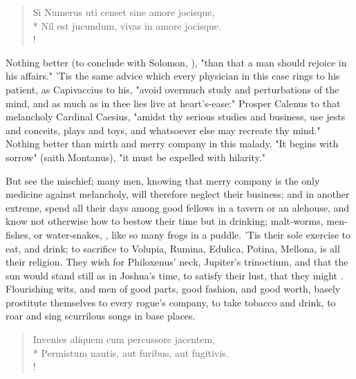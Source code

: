 {\begin{latin}
\begin{verse}%
Si Numerus uti censet sine amore jocisque,\\*
Nil est jucundum, vivas in amore jocisque.\\!
\end{verse}%
\end{latin}
%

Nothing better (to conclude with Solomon, ), "than that a man should rejoice in his affairs." 'Tis the same advice which every physician in this case rings to his patient, as Capivaccius to his, "avoid overmuch study and perturbations of the mind, and as much as in thee lies live at heart's-ease:" Prosper Calenus to that melancholy Cardinal Caesius, "amidst thy serious studies and business, use jests and conceits, plays and toys, and whatsoever else may recreate thy mind." Nothing better than mirth and merry company in this malady. "It begins with sorrow" (saith Montanus), "it must be expelled with hilarity."

But see the mischief; many men, knowing that merry company is the only medicine against melancholy, will therefore neglect their business; and in another extreme, spend all their days among good fellows in a tavern or an alehouse, and know not otherwise how to bestow their time but in drinking; malt-worms, men-fishes, or water-snakes, , like so many frogs in a puddle. 'Tis their sole exercise to eat, and drink; to sacrifice to Volupia, Rumina, Edulica, Potina, Mellona, is all their religion. They wish for Philoxenus' neck, Jupiter's trinoctium, and that the sun would stand still as in Joshua's time, to satisfy their lust, that they might . Flourishing wits, and men of good parts, good fashion, and good worth, basely prostitute themselves to every rogue's company, to take tobacco and drink, to roar and sing scurrilous songs in base places.

\begin{latin}
\begin{verse}%
Invenies aliquem cum percussore jacentem,\\*
Permistum nautis, aut furibus, aut fugitivis.\\!
\end{verse}%
\end{latin}
%

}
